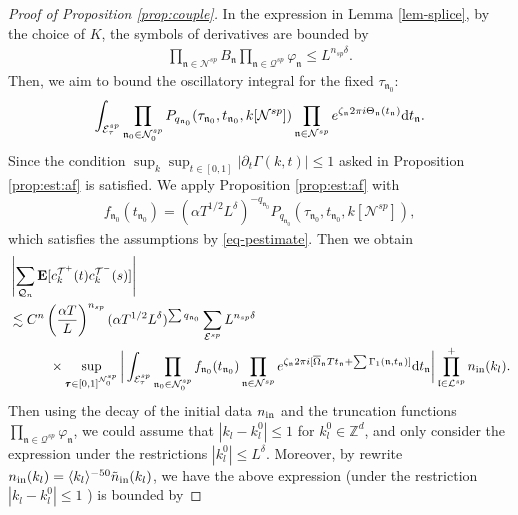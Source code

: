 \documentclass[UTF-8,reqno]{amsart}
\numberwithin{equation}{section}
\theoremstyle{definition}
\def\dif{{\mathord{{\rm d}}}}
\def\leq{\leqslant}
\def\dif{{\mathord{{\rm d}}}}
\def\leq{\leqslant}
\begin{document}
\begin{proof}[Proof of Proposition \ref{prop:couple}]
In the expression in    Lemma \ref{lem-splice}, by the choice of $K$, the symbols of derivatives  are bounded by \begin{align*}
\prod_{\mathfrak{n}\in\mathcal{N}^{sp}}B_\mathfrak{n}\prod_{\mathfrak{n}\in\mathcal{Q}^{sp}}\varphi_\mathfrak{n}\leq L^{n_{sp}\delta}.
    \end{align*}
    Then, we aim to bound the oscillatory integral for the fixed $\tau_{\mathfrak{n}_0}$:
    \begin{align}
      \int_{\mathcal{E}^{sp}_\tau} \prod_{\mathfrak{n}_0\in \mathcal{N}_0^{sp}}P_{q_{\mathfrak{n}_0}}(\tau_{\mathfrak{n}_0}, t_{\mathfrak n_0}, k[\mathcal N^{sp}])\prod_{\mathfrak{n}\in\mathcal{N}^{sp}}  e^{\zeta_\mathfrak{n}2\pi i\Theta_\mathfrak{n}(t_\mathfrak{n}) } \dif t_\mathfrak{n}\label{eq-osc}.
    \end{align}
Since the condition $\sup_k\sup_{t\in[0,1]}|\partial_t\Gamma(k,t)|\leq 1$ asked    in Proposition \ref{prop:est:af} is satisfied.
    We apply    Proposition \ref{prop:est:af} with \begin{align*}f_{\mathfrak{n}_0}(t_{\mathfrak n_0})=\left(\alpha T^{1/2}L^\delta\right)^{-q_{\mathfrak n_0}}P_{q_{\mathfrak n_0}}(\tau_{\mathfrak n_0}, t_{\mathfrak n_0}, k[\mathcal N^{sp}]),\end{align*} which satisfies the assumptions by \eqref{eq-pestimate}. Then we obtain
    \begin{align}
    &\left| \sum_{\mathcal{Q}_{n}}\mathbf{E}[ c^{\mathcal{T}^+}_k (t)c^{\mathcal{T}^-}_k(s)]\right| \notag\\
    &\lesssim 
      C^{n}\left( \frac{\alpha T}{L}\right)^{n_{{{sp}}}}(\alpha  T^{1/2}L^\delta )^{\sum q_{\mathfrak{n}_0}} \sum_{\mathcal{E}^{sp}}  %
      L^{n_{sp}\delta}\notag\\
&\quad\quad\quad  \times
\sup_{\pmb \tau \in [0,1]^{\mathcal N_0^{sp}}}\bigg{|}\int_{\mathcal{E}^{sp}_\tau} \prod_{\mathfrak{n}_0\in \mathcal{N}_0^{sp}}f_{\mathfrak{n}_0}(t_{\mathfrak n_0})\prod_{\mathfrak{n}\in\mathcal{N}^{sp}}  e^{\zeta_\mathfrak{n}2\pi i[\overline\Omega_\mathfrak{n}Tt_\mathfrak{n}+\sum\Gamma_1(\mathfrak{n},t_\mathfrak{n})]  } \dif t_\mathfrak{n}\bigg{|}
\prod_{\mathfrak{l} \in \mathcal{L}^{sp}}^+ n_{\rm in}(k_l).\end{align}
Then using the decay of the initial data $n_{\rm in}$ and the truncation functions $\prod_{\mathfrak{n}\in\mathcal{Q}^{sp}}\varphi_\mathfrak{n}$, we could assume that $|k_l-k_l^0|\leq1$ for $k_l^0\in \mathbb{Z}^d$, and only consider the expression under the restrictions $|k_l^0|\leq L^{\delta}$. 
 Moreover, by rewrite $n_{\rm in}(k_l)=\langle k_l\rangle^{-50}\tilde n_{\rm in}(k_l)$, we have the above expression (under the restriction  $|k_l-k_l^0|\leq1$ ) is bounded by


\end{proof}
\end{document}
